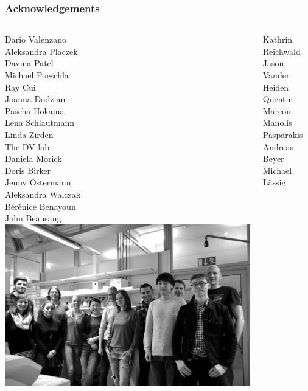 \documentclass[presentation]{beamer}
\begin{document}
\begin{frame}
\frametitle{Acknowledgements}
\small
\begin{columns}
Dario Valenzano\\
\alert{Aleksandra Placzek}\\
\alert{Davina Patel}\\
\alert{Michael Poeschla}\\
Ray Cui\\
Joanna Dodzian\\
\alert{Pascha Hokama}\\
\alert{Lena Schlautmann}\\
\alert{Linda Zirden}\\\vspace{1.7ex}
The DV lab\\\vspace{1.7ex}
Daniela Morick\\
Doris Birker\\
Jenny Ostermann\\\vspace{1.7ex}
Aleksandra Walczak\\
B\'{e}r\'{e}nice Benayoun\\
John Beausang
\includegraphics[width=\textwidth]{figs/jpg/group-2016}\vspace{1em}\\
\begin{columns}
Kathrin Reichwald\\
Jason Vander Heiden\\
Quentin Marcou
Manolis Pasparakis\\
Andreas Beyer\\
Michael L\"assig\\
\end{columns}
\end{columns}
\end{frame}
%
\end{document}
